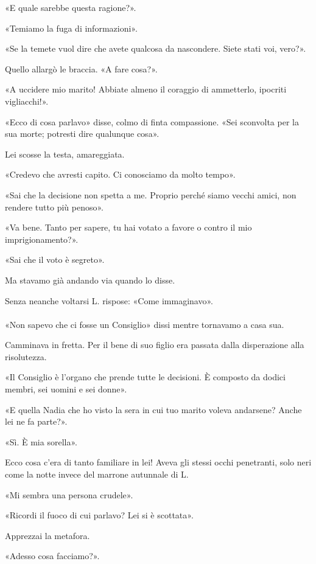 \documentclass[a4paper,12pt]{book}
\begin{document}
«E quale sarebbe questa ragione?».

«Temiamo la fuga di informazioni».

«Se la temete vuol dire che avete qualcosa da nascondere. Siete stati voi,
vero?».

Quello allargò le braccia. «A fare cosa?».

«A uccidere mio marito! Abbiate almeno il coraggio di ammetterlo, ipocriti
vigliacchi!».

«Ecco di cosa parlavo» disse, colmo di finta compassione. «Sei sconvolta per la
sua morte; potresti dire qualunque cosa».

Lei scosse la testa, amareggiata.

«Credevo che avresti capito. Ci conosciamo da molto tempo».

«Sai che la decisione non spetta a me. Proprio perché siamo vecchi amici, non
rendere tutto più penoso».

«Va bene. Tanto per sapere, tu hai votato a favore o contro il mio
imprigionamento?».

«Sai che il voto è segreto».

Ma stavamo già andando via quando lo disse.

Senza neanche voltarsi L. rispose: «Come immaginavo».

\paragraph{}
«Non sapevo che ci fosse un Consiglio» dissi mentre tornavamo a casa sua.

Camminava in fretta. Per il bene di suo figlio era passata dalla disperazione
alla risolutezza.

«Il Consiglio è l'organo che prende tutte le decisioni. È composto da dodici
membri, sei uomini e sei donne».

«E quella Nadia che ho visto la sera in cui tuo marito voleva andarsene? Anche
lei ne fa parte?».

«Sì. È mia sorella».

Ecco cosa c'era di tanto familiare in lei! Aveva gli stessi occhi penetranti,
solo neri come la notte invece del marrone autunnale di L.

«Mi sembra una persona crudele».

«Ricordi il fuoco di cui parlavo? Lei si è scottata».

Apprezzai la metafora.

«Adesso cosa facciamo?».
\end{document}

